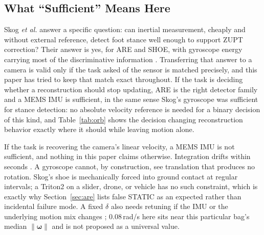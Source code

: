 \documentclass[journal]{IEEEtran}
\DeclareRobustCommand{\norm}[1]{\lVert #1 \rVert}
\begin{document}
\subsection{What ``Sufficient'' Means Here}
\label{sec:sufficient}
Skog \textit{et al.} \cite{skog2010tbe} answer a specific question: can inertial
measurement, cheaply and without external reference, detect foot stance well
enough to support ZUPT correction? Their answer is yes, for ARE and SHOE, with
gyroscope energy carrying most of the discriminative information
\cite{skog2010tbe,skog2010ipin}. Transferring that answer to a camera is valid
only if the task asked of the sensor is matched precisely, and this paper has
tried to keep that match exact throughout. If the task is deciding whether a
reconstruction should stop updating, ARE is the right detector family and a MEMS
IMU is sufficient, in the same sense Skog's gyroscope was sufficient for stance
detection: no absolute velocity reference is needed for a binary decision of
this kind, and Table~\ref{tab:orb} shows the decision changing reconstruction
behavior exactly where it should while leaving motion alone.

If the task is recovering the camera's linear velocity, a MEMS IMU is not
sufficient, and nothing in this paper claims otherwise. Integration drifts
within seconds \cite{wahlstrom2021}. A gyroscope cannot, by construction, see
translation that produces no rotation. Skog's shoe is mechanically forced into
ground contact at regular intervals; a Triton2 on a slider, drone, or vehicle
has no such constraint, which is exactly why Section~\ref{sec:are} lists false
STATIC as an expected rather than incidental failure mode. A fixed \(\delta\)
also needs retuning if the IMU or the underlying motion mix changes
\cite{wahlstrom2021}; 0.08\,rad/s here sits near this particular bag's median
\(\norm{\boldsymbol{\omega}}\) and is not proposed as a universal value.
\end{document}
